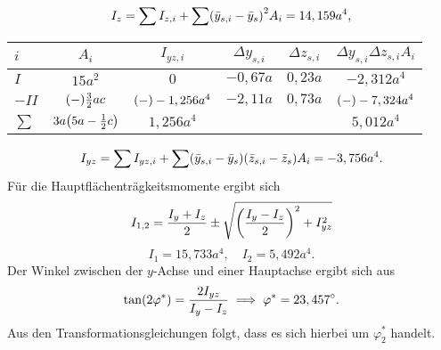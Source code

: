\documentclass{exercise}
\begin{document}
\begin{enumerate}
\begin{center}
\begin{tabular}{lcccc}
                \bottomrule
            \end{tabular}
        \end{center}
        \[
            I_z = \sum I_{z, i} + \sum\parentheses*{\bar{y}_{s, i} - \bar{y}_s}^2 A_i = 14,159a^4,
        \]
        \begin{center}
            \begin{tabular}{lccccc}
                \toprule
                \(i\) & \(A_i\) & \(I_{yz, i}\) & \(\Delta y_{s, i}\) & \(\Delta z_{s, i}\) & \(\Delta y_{s, i}\Delta z_{s, i} A_i\)\\
                \midrule
                \(I\) & \(15a^2\) & \(0\) & \(-0,67a\) & \(0,23a\) & \(-2,312a^4\)\\
                \(-II\) & \(\parentheses*{-}\frac{3}{2}ac\) & \(\parentheses*{-}-1,256a^4\) & \(-2,11a\) & \(0,73a\) & \(\parentheses*{-}-7,324a^4\)\\
                \midrule
                \(\sum\) & \(3a\parentheses*{5a - \frac{1}{2}c}\) & \(1,256a^4\) & & & \(5,012a^4\)\\
                \bottomrule
            \end{tabular}
        \end{center}
        \[
            I_{yz} = \sum I_{yz, i} + \sum\parentheses*{\bar{y}_{s, i} - \bar{y}_s}\parentheses*{\bar{z}_{s, i} - \bar{z}_s} A_i = -3,756a^4.
        \]
        Für die Hauptflächenträgkeitsmomente ergibt sich
        \[
            I_{1, 2} = \frac{I_y + I_z}{2} \pm \sqrt{\parentheses*{\frac{I_y - I_z}{2}}^2 + I_{yz}^2}
        \]
        \[
            I_1 = 15,733a^4, \quad I_2 = 5,492a^4.
        \]
        Der Winkel zwischen der \(y\)-Achse und einer Hauptachse ergibt sich aus
        \[
            \tan\parentheses*{2\varphi^*} = \frac{2I_{yz}}{I_y - I_z} \implies \varphi^* = 23,457^\circ.
        \]
        Aus den Transformationsgleichungen folgt, dass es sich hierbei um \(\varphi_2^*\) handelt.
    \end{enumerate}
\end{document}
